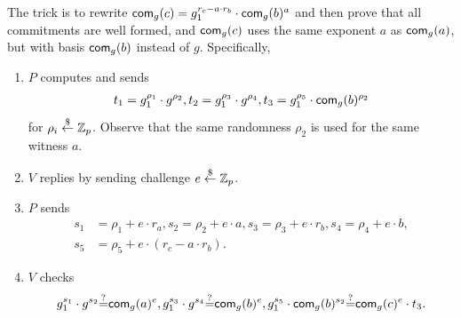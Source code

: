 {\begin{itemize}
  The trick is to rewrite
  $\mathsf{com}_g(c)=g_1^{r_c-a\cdot{}r_b}\cdot\mathsf{com}_g(b)^{a}$ and then prove
  that all commitments are well formed, and $\mathsf{com}_g(c)$ uses the same
  exponent $a$ as $\mathsf{com}_g(a)$, but with basis $\mathsf{com}_g(b)$ instead of
  $g$. Specifically,
  \begin{enumerate}
  \item $P$ computes and sends
    \begin{align*}
      t_1=g_1^{\rho_1}\cdot{}g^{\rho_2},
      t_2=g_1^{\rho_3}\cdot{}g^{\rho_4},
      t_3=g_1^{\rho_5}\cdot{}\mathsf{com}_g(b)^{\rho_2}
      \end{align*}
      for $\rho_i\stackrel{\$}{\leftarrow}\mathbb{Z}_p$. Observe that the same randomness $\rho_2$
      is used for the same witness $a$.
    \item $V$ replies by sending challenge $e\stackrel{\$}{\leftarrow}\mathbb{Z}_p$.
    \item $P$ sends
      \begin{align*}
        s_1&=\rho_1+e\cdot{}r_a,s_2=\rho_2+e\cdot{}a,s_3=\rho_3+e\cdot{}r_b,s_4=\rho_4+e\cdot{}b,\\s_5&=\rho_5+e\cdot{}(r_c-a\cdot{}r_b).
        \end{align*}
    \item $V$ checks
      \begin{align*}
        g_1^{s_1}\cdot{}g^{s_2}{\stackrel{?}{=}}{}\mathsf{com}_g(a)^e, g_1^{s_3}\cdot{}g^{s_4}{\stackrel{?}{=}}{}\mathsf{com}_g(b)^e, g_1^{s_5}\cdot{}\mathsf{com}_g(b)^{s_2}{\stackrel{?}{=}}{}\mathsf{com}_g(c)^e\cdot{}t_3.
        \end{align*}
\end{enumerate}

\end{itemize}
}%


